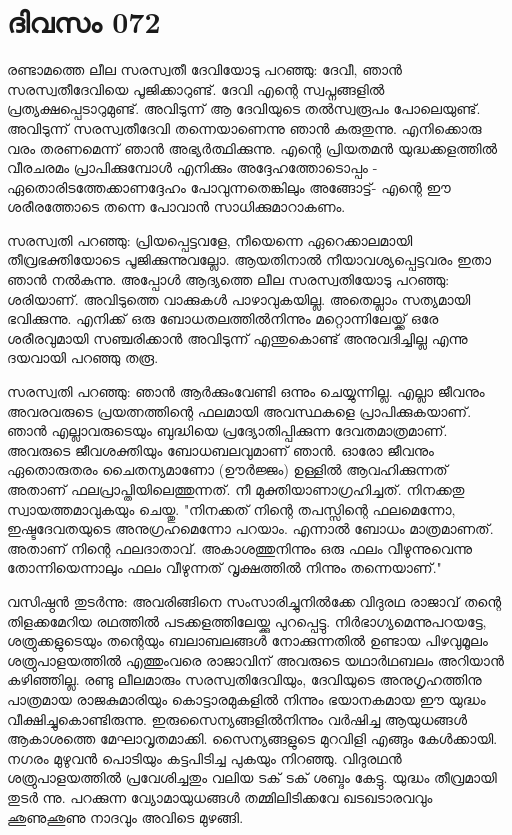  
\section{ദിവസം 072}


രണ്ടാമത്തെ ലീല സരസ്വതീ ദേവിയോടു പറഞ്ഞു: ദേവീ, ഞാന്‍ സരസ്വതീദേവിയെ പൂജിക്കാറുണ്ട്‌. ദേവി എന്റെ സ്വപ്നങ്ങളില്‍ പ്രത്യക്ഷപ്പെടാറുമുണ്ട്‌. അവിടുന്ന് ആ ദേവിയുടെ തല്‍സ്വരൂപം പോലെയുണ്ട്‌. അവിടുന്ന് സരസ്വതീദേവി തന്നെയാണെന്നു ഞാന്‍ കരുതുന്നു. എനിക്കൊരു വരം തരണമെന്ന് ഞാന്‍ അഭ്യര്‍ത്ഥിക്കുന്നു. എന്റെ പ്രിയതമന്‍ യുദ്ധക്കളത്തില്‍ വീരചരമം പ്രാപിക്കുമ്പോള്‍ എനിക്കും അദ്ദേഹത്തോടൊപ്പം - ഏതൊരിടത്തേക്കാണദ്ദേഹം പോവുന്നതെങ്കിലും അങ്ങോട്ട്‌- എന്റെ ഈ ശരീരത്തോടെ തന്നെ പോവാന്‍ സാധിക്കുമാറാകണം.

സരസ്വതി പറഞ്ഞു: പ്രിയപ്പെട്ടവളേ, നീയെന്നെ ഏറെക്കാലമായി തീവ്രഭക്തിയോടെ പൂജിക്കുന്നുവല്ലോ. ആയതിനാല്‍ നീയാവശ്യപ്പെട്ടവരം ഇതാ ഞാന്‍ നല്‍കുന്നു. അപ്പോള്‍ ആദ്യത്തെ ലീല സരസ്വതിയോടു പറഞ്ഞു: ശരിയാണ്‌. അവിടുത്തെ വാക്കുകള്‍ പാഴാവുകയില്ല. അതെല്ലാം സത്യമായി ഭവിക്കുന്നു. എനിക്ക്‌ ഒരു ബോധതലത്തില്‍നിന്നും മറ്റൊന്നിലേയ്ക്ക്‌ ഒരേ ശരീരവുമായി സഞ്ചരിക്കാന്‍ അവിടുന്ന് എന്തുകൊണ്ട്‌ അനുവദിച്ചില്ല എന്നു ദയവായി പറഞ്ഞു തരൂ.

സരസ്വതി പറഞ്ഞു: ഞാന്‍ ആര്‍ക്കുംവേണ്ടി ഒന്നും ചെയ്യുന്നില്ല. എല്ലാ ജീവനും അവരവരുടെ പ്രയത്നത്തിന്റെ ഫലമായി അവസ്ഥകളെ പ്രാപിക്കുകയാണ്‌. ഞാന്‍ എല്ലാവരുടെയും ബുദ്ധിയെ പ്രദ്യോതിപ്പിക്കുന്ന ദേവതമാത്രമാണ്‌. അവരുടെ ജീവശക്തിയും ബോധബലവുമാണ്‌ ഞാന്‍. ഓരോ ജീവനും ഏതൊരുതരം ചൈതന്യമാണോ (ഊര്‍ജ്ജം) ഉള്ളില്‍ ആവഹിക്കുന്നത്‌ അതാണ്‌ ഫലപ്രാപ്തിയിലെത്തുന്നത്‌. നീ മുക്തിയാണാഗ്രഹിച്ചത്‌. നിനക്കതു സ്വായത്തമാവുകയും ചെയ്തു. "നിനക്കത്‌ നിന്റെ തപസ്സിന്റെ ഫലമെന്നോ, ഇഷ്ടദേവതയുടെ അനുഗ്രഹമെന്നോ പറയാം. എന്നാല്‍ ബോധം മാത്രമാണത്‌. അതാണ്‌ നിന്റെ ഫലദാതാവ്‌. അകാശത്തുനിന്നും ഒരു ഫലം വീഴുന്നുവെന്നു തോന്നിയെന്നാലും ഫലം വീഴുന്നത്‌ വൃക്ഷത്തില്‍ നിന്നും തന്നെയാണ്‌."

വസിഷ്ഠന്‍ തുടര്‍ന്നു: അവരിങ്ങിനെ സംസാരിച്ചുനില്‍ക്കേ വിദുരഥ രാജാവ്‌ തന്റെ തിളക്കമേറിയ രഥത്തില്‍ പടക്കളത്തിലേയ്ക്കു പുറപ്പെട്ടു. നിര്‍ഭാഗ്യമെന്നുപറയട്ടേ, ശത്രുക്കളുടെയും തന്റെയും ബലാബലങ്ങള്‍ നോക്കുന്നതില്‍ ഉണ്ടായ പിഴവുമൂലം ശത്രുപാളയത്തില്‍ എത്തുംവരെ രാജാവിന്‌ അവരുടെ യഥാര്‍ഥബലം അറിയാന്‍ കഴിഞ്ഞില്ല. രണ്ടു ലീലമാരും സരസ്വതിദേവിയും, ദേവിയുടെ അനുഗൃഹത്തിനു പാത്രമായ രാജകുമാരിയും കൊട്ടാരമുകളില്‍ നിന്നും ഭയാനകമായ ഈ യുദ്ധം വീക്ഷിച്ചുകൊണ്ടിരുന്നു. ഇരുസൈന്യങ്ങളില്‍നിന്നും വര്‍ഷിച്ച ആയുധങ്ങള്‍ ആകാശത്തെ മേഘാവൃതമാക്കി. സൈന്യങ്ങളുടെ മുറവിളി എങ്ങും കേള്‍ക്കായി. നഗരം മുഴുവന്‍ പൊടിയും കട്ടപിടിച്ച പുകയും നിറഞ്ഞു. വിദുരഥന്‍ ശത്രുപാളയത്തില്‍ പ്രവേശിച്ചതും വലിയ ടക്‌ ടക്‌ ശബ്ദം കേട്ടു. യുദ്ധം തീവ്രമായി തുടര്‍ ന്നു. പറക്കുന്ന വ്യോമായുധങ്ങള്‍ തമ്മിലിടിക്കവേ ഖടഖടാരവവും ഛുണുഛുണു നാദവും അവിടെ മുഴങ്ങി.
